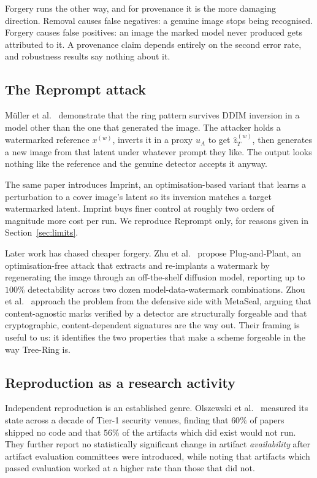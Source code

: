 \documentclass[10pt,twocolumn]{article}
\begin{document}
Forgery runs the other way, and for provenance it is the more damaging direction.
Removal causes false negatives: a genuine image stops being recognised. Forgery causes
false positives: an image the marked model never produced gets attributed to it. A
provenance claim depends entirely on the second error rate, and robustness results say
nothing about it.

\subsection{The Reprompt attack}

M\"uller et al.~\cite{muller2025semantic} demonstrate that the ring pattern survives
DDIM inversion in a model other than the one that generated the image. The attacker
holds a watermarked reference $x^{(w)}$, inverts it in a proxy $u_A$ to get
$\hat{z}_T^{(w)}$, then generates a new image from that latent under whatever prompt
they like. The output looks nothing like the reference and the genuine detector
accepts it anyway.

The same paper introduces Imprint, an optimisation-based variant that learns a
perturbation to a cover image's latent so its inversion matches a target watermarked
latent. Imprint buys finer control at roughly two orders of magnitude more cost per
run. We reproduce Reprompt only, for reasons given in Section~\ref{sec:limits}.

Later work has chased cheaper forgery. Zhu et al.~\cite{zhu2025optfree} propose
Plug-and-Plant, an optimisation-free attack that extracts and re-implants a watermark
by regenerating the image through an off-the-shelf diffusion model, reporting up to
$100\%$ detectability across two dozen model-data-watermark combinations. Zhou et
al.~\cite{zhou2026metaseal} approach the problem from the defensive side with
MetaSeal, arguing that content-agnostic marks verified by a detector are structurally
forgeable and that cryptographic, content-dependent signatures are the way out. Their
framing is useful to us: it identifies the two properties that make a scheme
forgeable in the way Tree-Ring is.

\subsection{Reproduction as a research activity}

Independent reproduction is an established genre. Olszewski et
al.~\cite{olszewski2023reproducibility} measured its state across a decade of Tier-1
security venues, finding that $60\%$ of papers shipped no code and that $56\%$ of the
artifacts which did exist would not run. They further report no statistically
significant change in artifact \emph{availability} after artifact evaluation
committees were introduced, while noting that artifacts which passed evaluation
worked at a higher rate than those that did not.
\end{document}
